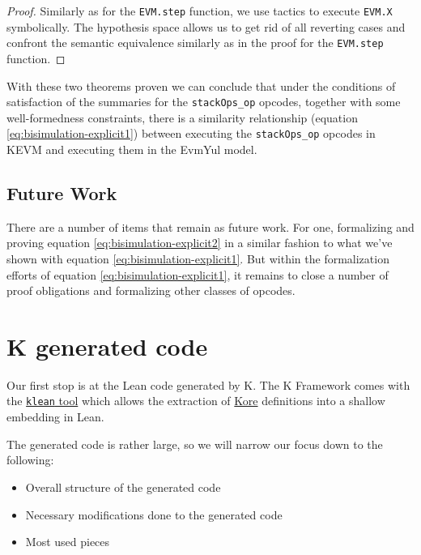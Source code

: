 \begin{proof}

Similarly as for the \texttt{EVM.step} function, we use tactics to execute
\texttt{EVM.X} symbolically. The hypothesis space allows us to get rid of all
reverting cases and confront the semantic equivalence similarly as in the proof
for the \texttt{EVM.step} function.

\end{proof}

With these two theorems proven we can conclude that under the conditions of
satisfaction of the summaries for the \texttt{stackOps_op} opcodes, together
with some well-formedness constraints, there is a similarity relationship
(equation \ref{eq:bisimulation-explicit1}) between executing the
\texttt{stackOps_op} opcodes in KEVM and executing them in the EvmYul model.

\section{Future Work}

There are a number of items that remain as future work. For one, formalizing and
proving equation \ref{eq:bisimulation-explicit2} in a similar fashion to what
we've shown with equation \ref{eq:bisimulation-explicit1}.
But within the formalization efforts of equation
\ref{eq:bisimulation-explicit1}, it remains to close a number of proof
obligations and formalizing other classes of opcodes.


\chapter{K generated code}\label{chap:gencode}

Our first stop is at the Lean code generated by K. The K Framework comes with
the
\href{https://github.com/runtimeverification/k/tree/master/pyk/src/pyk/klean}{\texttt{klean}
tool} which allows the extraction of
\href{https://kframework.org/docs/user_manual/#k-process-overview}{Kore}
definitions into a shallow embedding in Lean.

The generated code is rather
large, so we will narrow our focus down to the following:

\begin{itemize}
\item Overall structure of the generated code
\item Necessary modifications done to the generated code
\item Most used pieces
\end{itemize}

